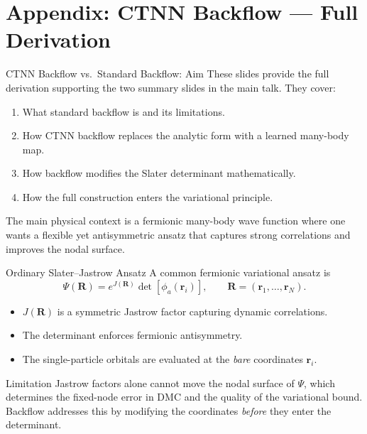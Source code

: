 \documentclass[aspectratio=169,10pt]{beamer}
\begin{document}
\appendix

\section*{Appendix: CTNN Backflow — Full Derivation}

\begin{frame}{CTNN Backflow vs.\ Standard Backflow: Aim}
These slides provide the full derivation supporting the two summary slides
in the main talk. They cover:
\begin{enumerate}
  \item What standard backflow is and its limitations.
  \item How CTNN backflow replaces the analytic form with a learned
        many-body map.
  \item How backflow modifies the Slater determinant mathematically.
  \item How the full construction enters the variational principle.
\end{enumerate}
\vspace{0.3cm}
The main physical context is a fermionic many-body wave function where
one wants a flexible yet antisymmetric ansatz that captures strong
correlations and improves the nodal surface.
\end{frame}


\begin{frame}{Ordinary Slater--Jastrow Ansatz}
A common fermionic variational ansatz is
\[
  \Psi(\mathbf{R})
  = e^{J(\mathbf{R})}\det[\phi_a(\mathbf{r}_i)],
  \qquad
  \mathbf{R}=(\mathbf{r}_1,\dots,\mathbf{r}_N).
\]
\begin{itemize}
  \item $J(\mathbf{R})$ is a symmetric Jastrow factor capturing dynamic
        correlations.
  \item The determinant enforces fermionic antisymmetry.
  \item The single-particle orbitals are evaluated at the \emph{bare}
        coordinates $\mathbf{r}_i$.
\end{itemize}
\vspace{0.3cm}
\begin{alertblock}{Limitation}
  Jastrow factors alone cannot move the nodal surface of
  $\Psi$, which determines the fixed-node error in DMC and
  the quality of the variational bound.
  Backflow addresses this by modifying the coordinates
  \emph{before} they enter the determinant.
\end{alertblock}
\end{frame}
\end{document}
